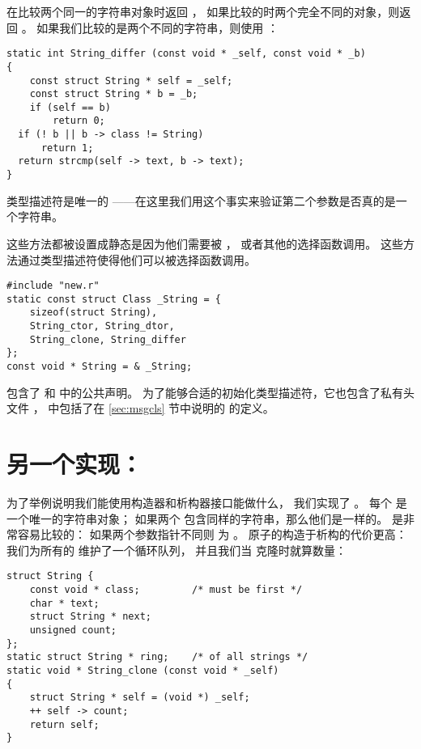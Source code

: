  在比较两个同一的字符串对象时返回 ，
如果比较的时两个完全不同的对象，则返回 。
如果我们比较的是两个不同的字符串，则使用 ：
\begin{lstlisting}
static int String_differ (const void * _self, const void * _b)
{   
    const struct String * self = _self;
    const struct String * b = _b;
    if (self == b)
        return 0;
  if (! b || b -> class != String)
      return 1;
  return strcmp(self -> text, b -> text);
}
\end{lstlisting}

类型描述符是唯一的
——在这里我们用这个事实来验证第二个参数是否真的是一个字符串。

这些方法都被设置成静态是因为他们需要被
， 或者其他的选择函数调用。 这些方法通过类型描述符使得他们可以被选择函数调用。

\begin{lstlisting}
#include "new.r"
static const struct Class _String = {
    sizeof(struct String),
    String_ctor, String_dtor,
    String_clone, String_differ
};
const void * String = & _String;
\end{lstlisting}

 包含了  和  中的公共声明。
为了能够合适的初始化类型描述符，它也包含了私有头文件 ，
 中包括了在 \ref{sec:msgcls} 节中说明的
 的定义。

\section{另一个实现：}
\label{sec:atom}

为了举例说明我们能使用构造器和析构器接口能做什么，
我们实现了 。
每个  是一个唯一的字符串对象；
如果两个  包含同样的字符串，那么他们是一样的。
 是非常容易比较的：
如果两个参数指针不同则  为 。
原子的构造于析构的代价更高：
我们为所有的  维护了一个循环队列，
并且我们当  克隆时就算数量：
\begin{lstlisting}
struct String {
    const void * class;         /* must be first */
    char * text;
    struct String * next;
    unsigned count;
};
static struct String * ring;    /* of all strings */
static void * String_clone (const void * _self)
{   
    struct String * self = (void *) _self;
    ++ self -> count;
    return self;
}
\end{lstlisting}

